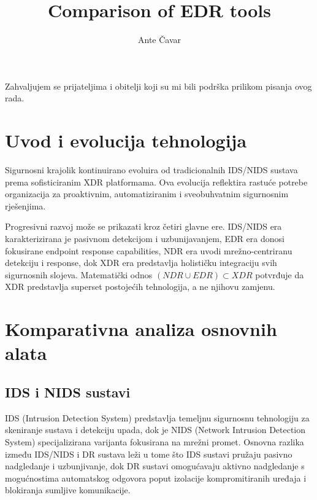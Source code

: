 \documentclass[utf8, seminar]{fer}
\title{Comparison of EDR tools}
\author{Ante Čavar}
\renewcommand\thepage{}
\begin{document}
\maketitle
\begin{zahvale}
Zahvaljujem se prijateljima i obitelji koji su mi bili podrška prilikom pisanja ovog rada.
\end{zahvale}
\newpage
\tableofcontents
\newpage
\mainmatter
\setcounter{page}{1}
\renewcommand\thepage{\arabic{page}}
% 
% 
% 
% 
% 
%
\chapter{Uvod i evolucija tehnologija}

Sigurnosni krajolik kontinuirano evoluira od tradicionalnih IDS/NIDS sustava prema sofisticiranim XDR platformama. Ova evolucija reflektira rastuće potrebe organizacija za proaktivnim, automatiziranim i sveobuhvatnim sigurnosnim rješenjima.

Progresivni razvoj može se prikazati kroz četiri glavne ere. IDS/NIDS era karakterizirana je pasivnom detekcijom i uzbunijavanjem, EDR era donosi fokusirane endpoint response capabilities, NDR era uvodi mrežno-centriranu detekciju i response, dok XDR era predstavlja holističku integraciju svih sigurnosnih slojeva. Matematički odnos $(NDR \cup EDR) \subset XDR$ potvrđuje da XDR predstavlja superset postojećih tehnologija, a ne njihovu zamjenu.

\chapter{Komparativna analiza osnovnih alata}

\section{IDS i NIDS sustavi}

IDS (Intrusion Detection System) predstavlja temeljnu sigurnosnu tehnologiju za skeniranje sustava i detekciju upada, dok je NIDS (Network Intrusion Detection System) specijalizirana varijanta fokusirana na mrežni promet. Osnovna razlika između IDS/NIDS i DR sustava leži u tome što IDS sustavi pružaju pasivno nadgledanje i uzbunjivanje, dok DR sustavi omogućavaju aktivno nadgledanje s mogućnostima automatskog odgovora poput izolacije kompromitiranih uređaja i blokiranja sumljive komunikacije.
\end{document}
